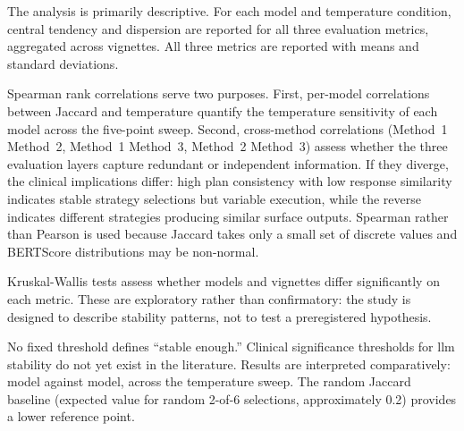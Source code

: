 The analysis is primarily descriptive. For each model and temperature
condition, central tendency and dispersion are reported for all three
evaluation metrics, aggregated across vignettes.
All three metrics are reported with means and standard deviations.

Spearman rank correlations serve two purposes. First, per-model
correlations between Jaccard and temperature quantify the temperature
sensitivity of each model across the five-point sweep. Second,
cross-method correlations (Method~1 \vs Method~2, Method~1 \vs Method~3,
Method~2 \vs Method~3) assess whether the three evaluation layers capture
redundant or independent information. If they diverge, the clinical
implications differ: high plan consistency with low response similarity
indicates stable strategy selections but variable execution, while the
reverse indicates different strategies producing similar surface outputs.
Spearman rather than Pearson is used because Jaccard takes only a small
set of discrete values and BERTScore distributions may be non-normal.

Kruskal-Wallis tests assess whether models and vignettes differ
significantly on each metric. These are exploratory rather than
confirmatory: the study is designed to describe stability patterns, not to
test a preregistered hypothesis.

No fixed threshold defines ``stable enough.'' Clinical significance
thresholds for \gls{llm} stability do not yet exist in the literature.
Results are interpreted comparatively: model against model, across the
temperature sweep. The random Jaccard baseline (expected value for random
2-of-6 selections, approximately 0.2) provides a lower reference point.
